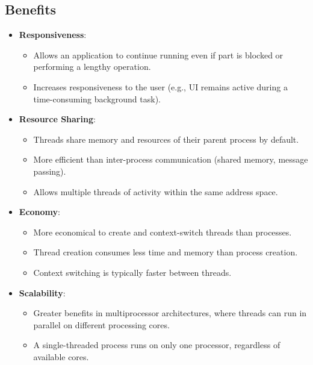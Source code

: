 \subsection{Benefits}
\begin{itemize}
    \item \textbf{Responsiveness}:
        \begin{itemize}
            \item Allows an application to continue running even if part is blocked or performing a lengthy operation.
            \item Increases responsiveness to the user (e.g., UI remains active during a time-consuming background task).
        \end{itemize}
    \item \textbf{Resource Sharing}:
        \begin{itemize}
            \item Threads share memory and resources of their parent process by default.
            \item More efficient than inter-process communication (shared memory, message passing).
            \item Allows multiple threads of activity within the same address space.
        \end{itemize}
    \item \textbf{Economy}:
        \begin{itemize}
            \item More economical to create and context-switch threads than processes.
            \item Thread creation consumes less time and memory than process creation.
            \item Context switching is typically faster between threads.
        \end{itemize}
    \item \textbf{Scalability}:
        \begin{itemize}
            \item Greater benefits in multiprocessor architectures, where threads can run in parallel on different processing cores.
            \item A single-threaded process runs on only one processor, regardless of available cores.
        \end{itemize}
\end{itemize}

